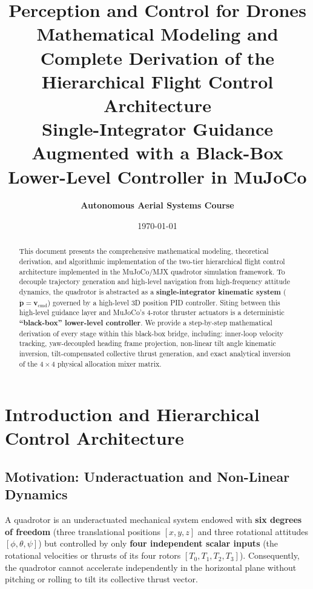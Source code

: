 \documentclass[11pt,a4paper]{article}
\title{\textbf{\Huge Perception and Control for Drones}\\[0.6em]
\Large Mathematical Modeling and Complete Derivation of the Hierarchical Flight Control Architecture\\[0.3em]
\large Single-Integrator Guidance Augmented with a Black-Box Lower-Level Controller in MuJoCo}
\author{\textbf{Autonomous Aerial Systems Course}}
\date{\today}
\begin{document}
\maketitle

\begin{abstract}
This document presents the comprehensive mathematical modeling, theoretical derivation, and algorithmic implementation of the two-tier hierarchical flight control architecture implemented in the MuJoCo/MJX quadrotor simulation framework. To decouple trajectory generation and high-level navigation from high-frequency attitude dynamics, the quadrotor is abstracted as a \textbf{single-integrator kinematic system} ($\mathbf{\dot{p}} = \mathbf{v}_{\mathrm{cmd}}$) governed by a high-level 3D position PID controller. Siting between this high-level guidance layer and MuJoCo's 4-rotor thruster actuators is a deterministic \textbf{``black-box'' lower-level controller}. We provide a step-by-step mathematical derivation of every stage within this black-box bridge, including: inner-loop velocity tracking, yaw-decoupled heading frame projection, non-linear tilt angle kinematic inversion, tilt-compensated collective thrust generation, and exact analytical inversion of the $4 \times 4$ physical allocation mixer matrix.
\end{abstract}

\tableofcontents
\newpage

\section{Introduction and Hierarchical Control Architecture}

\subsection{Motivation: Underactuation and Non-Linear Dynamics}
A quadrotor is an underactuated mechanical system endowed with \textbf{six degrees of freedom} (three translational positions $[x,y,z]$ and three rotational attitudes $[\phi, \theta, \psi]$) but controlled by only \textbf{four independent scalar inputs} (the rotational velocities or thrusts of its four rotors $[T_0, T_1, T_2, T_3]$). Consequently, the quadrotor cannot accelerate independently in the horizontal plane without pitching or rolling to tilt its collective thrust vector.
\end{document}
